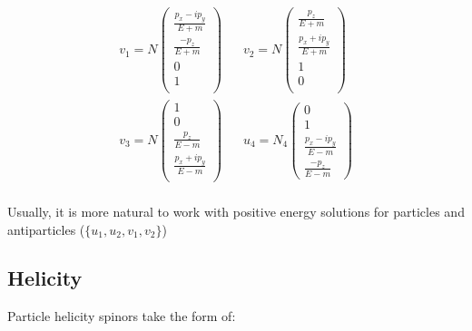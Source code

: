 \documentclass[10pt]{article}
\theoremstyle{definition}
\begin{document}
\begin{align*}
    v_1 = N\begin{pmatrix}
        \frac{p_x-ip_y}{E+m}\\
        \frac{-p_z}{E+m}\\
        0\\
        1\\
    \end{pmatrix}
    \;\;\; &
    v_2 = N\begin{pmatrix}
        \frac{p_z}{E+m}\\
        \frac{p_x+ip_y}{E+m}\\
        1\\
        0\\
    \end{pmatrix}\\
    v_3 = N\begin{pmatrix}
        1\\
        0\\
        \frac{p_z}{E-m}\\
        \frac{p_x+ip_y}{E-m}\\
    \end{pmatrix}
    \;\;\; &
    u_4 = N_4\begin{pmatrix}
        0\\
        1\\
        \frac{p_x-ip_y}{E-m}\\
        \frac{-p_z}{E-m}
    \end{pmatrix}\\
\end{align*}

Usually, it is more natural to work with positive energy solutions for particles and antiparticles ($\{u_1,u_2,v_1,v_2\}$)

\subsection*{Helicity}%

Particle helicity spinors take the form of:
\end{document}
